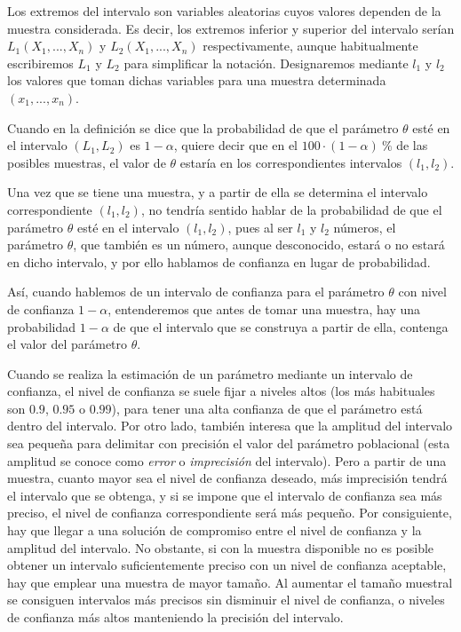 \documentclass[a4paper]{article}
\begin{document}
Los extremos del intervalo son variables aleatorias cuyos valores
dependen de la muestra considerada. Es decir, los extremos
inferior y superior del intervalo serían $L_{1}\left(
X_{1},...,X_{n}\right) $ y $L_{2}\left(
X_{1},...,X_{n}\right) $ respectivamente, aunque habitualmente escribiremos $%
L_{1}$ y $L_{2}$ para simplificar la notación. Designaremos mediante $%
l_{1}$ y $l_{2}$ los valores que toman dichas variables para una
muestra determinada $\left( x_{1},...,x_{n}\right) .$

Cuando en la definición se dice que la probabilidad de que el
parámetro $\theta $ esté en el intervalo $\left(
L_{1},L_{2}\right) $ es $1-\alpha $, quiere decir que en el
$100\cdot \left( 1-\alpha \right) \ \% $ de las posibles muestras,
el valor de $\theta $ estaría en los correspondientes
intervalos $\left( l_{1},l_{2}\right) .$

Una vez que se tiene una muestra, y a partir de ella se determina
el intervalo correspondiente $\left( l_{1},l_{2}\right) $, no
tendría sentido hablar de la probabilidad de que el
parámetro $\theta $ esté en el intervalo $\left(
l_{1},l_{2}\right) $, pues al ser $l_{1}$ y $l_{2}$ números,
el parámetro $\theta $, que también es un número,
aunque desconocido, estará o no estará en dicho intervalo,
y por ello hablamos de confianza en lugar de probabilidad.

Así, cuando hablemos de un intervalo de confianza para el parámetro $\theta $ con nivel de confianza $1-\alpha $, entenderemos que
antes de tomar una muestra, hay una probabilidad $1-\alpha $ de
que el intervalo que se construya a partir de ella, contenga el
valor del parámetro $\theta .$

Cuando se realiza la estimación de un parámetro mediante
un intervalo de confianza, el nivel de confianza se suele fijar a niveles altos (los más habituales son $0.9$, $0.95$ o $0.99$), para tener una alta confianza de que el parámetro está dentro del intervalo. Por otro lado, también interesa que la amplitud del intervalo sea pequeña para
delimitar con precisión el valor del parámetro
poblacional (esta amplitud se conoce como \emph{error} o \emph{imprecisión} del intervalo).
Pero a partir de una muestra, cuanto mayor sea el
nivel de confianza deseado, más imprecisión tendrá el
intervalo que se obtenga, y si se impone que el intervalo de
confianza sea más preciso, el nivel de confianza
correspondiente será más pequeño. Por consiguiente,
hay que llegar a una solución de compromiso entre el nivel de
confianza y la amplitud del intervalo. No obstante, si con la
muestra disponible no es posible obtener un intervalo
suficientemente preciso con un nivel de confianza aceptable, hay
que emplear una muestra de mayor tamaño. Al aumentar el tamaño muestral se consiguen
intervalos más precisos sin disminuir el nivel
de confianza, o niveles de confianza más altos manteniendo la
precisión del intervalo.
\end{document}
